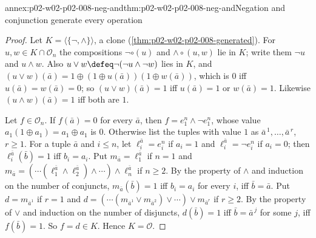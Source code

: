 \begin{annexitem}{annex:p02-w02-p02-008-neg-and}{thm:p02-w02-p02-008-neg-and}{Negation and conjunction generate every operation}
\begin{proof}
Let \(K=\langle\{\neg,\land\}\rangle\), a clone
(\cref{thm:p02-w02-p02-008-generated}).  For \(u,w\in K\cap\mathcal O_n\)
the compositions \(\neg\circ(u)\) and \(\land\circ(u,w)\) lie in \(K\); write
them \(\neg u\) and \(u\land w\).  Also
\(u\lor w\defeq\neg(\neg u\land\neg w)\) lies in \(K\), and
\((u\lor w)(\bar a)=1\oplus(1\oplus u(\bar a))(1\oplus w(\bar a))\), which is
\(0\) iff \(u(\bar a)=w(\bar a)=0\); so \((u\lor w)(\bar a)=1\) iff
\(u(\bar a)=1\) or \(w(\bar a)=1\).  Likewise \((u\land w)(\bar a)=1\) iff
both are \(1\).

Let \(f\in\mathcal O_n\).  If \(f(\bar a)=0\) for every \(\bar a\), then
\(f=e^n_1\land\neg e^n_1\), whose value \(a_1(1\oplus a_1)=a_1\oplus a_1\) is
\(0\).  Otherwise list the tuples with value \(1\) as
\(\bar a^{\,1},\ldots,\bar a^{\,r}\), \(r\geq1\).  For a tuple \(\bar a\) and
\(i\leq n\), let \(\ell^{\bar a}_i=e^n_i\) if \(a_i=1\) and
\(\ell^{\bar a}_i=\neg e^n_i\) if \(a_i=0\); then
\(\ell^{\bar a}_i(\bar b)=1\) iff \(b_i=a_i\).  Put
\(m_{\bar a}=\ell^{\bar a}_1\) if \(n=1\) and
\(m_{\bar a}=(\cdots(\ell^{\bar a}_1\land\ell^{\bar a}_2)\land\cdots)\land
\ell^{\bar a}_n\) if \(n\geq2\).  By the property of \(\land\) and induction
on the number of conjuncts, \(m_{\bar a}(\bar b)=1\) iff \(b_i=a_i\) for
every \(i\), iff \(\bar b=\bar a\).  Put \(d=m_{\bar a^1}\) if \(r=1\) and
\(d=(\cdots(m_{\bar a^1}\lor m_{\bar a^2})\lor\cdots)\lor m_{\bar a^r}\) if
\(r\geq2\).  By the property of \(\lor\) and induction on the number of
disjuncts, \(d(\bar b)=1\) iff \(\bar b=\bar a^{\,j}\) for some \(j\), iff
\(f(\bar b)=1\).  So \(f=d\in K\).  Hence \(K=\mathcal O\).
\end{proof}
\end{annexitem}

